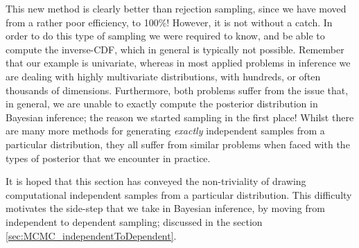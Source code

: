 \documentclass[11pt,fullpage]{book}
\begin{document}
This new method is clearly better than rejection sampling, since we have moved from a rather poor efficiency, to 100\%! However, it is not without a catch. In order to do this type of sampling we were required to know, and be able to compute the inverse-CDF, which in general is typically not possible. Remember that our example is univariate, whereas in most applied problems in inference we are dealing with highly multivariate distributions, with hundreds, or often thousands of dimensions. Furthermore, both problems suffer from the issue that, in general, we are unable to exactly compute the posterior distribution in Bayesian inference; the reason we started sampling in the first place! Whilst there are many more methods for generating \textit{exactly} independent samples from a particular distribution, they all suffer from similar problems when faced with the types of posterior that we encounter in practice.

It is hoped that this section has conveyed the non-triviality of drawing computational independent samples from a particular distribution. This difficulty motivates the side-step that we take in Bayesian inference, by moving from independent to dependent sampling; discussed in the section \ref{sec:MCMC_independentToDependent}.
\end{document}
